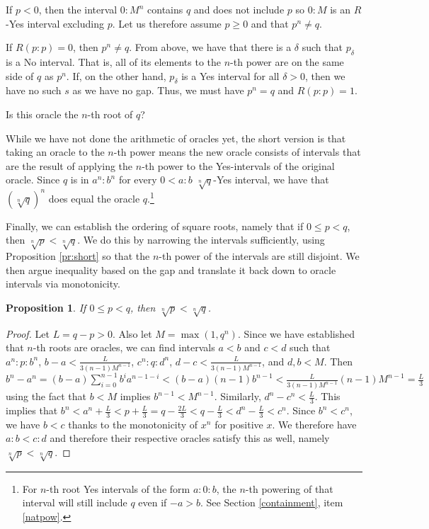 \documentclass[12pt]{article}
\newtheorem{proposition}{Proposition}[subsection]
\begin{document}
\begin{enumerate}
    If $p < 0$, then the interval $0:M^n$ contains $q$ and does not include $p$ so $0:M$ is an $R$-Yes interval excluding $p$. Let us therefore assume $p \geq 0$ and that $p^n \neq q$. 

    If $R(p:p) = 0$, then $p^n \neq q$. From above, we have that there is a $\delta$ such that $p_\delta$ is a No interval. That is, all of its elements to the $n$-th power are on the same side of $q$ as $p^n$. If, on the other hand, $p_\delta$ is a Yes interval for all $\delta > 0$, then we have no such $s$ as we have no gap. Thus, we must have $p^n = q$ and $R(p:p) = 1$.
    
\end{enumerate}

Is this oracle the $n$-th root of $q$?

While we have not done the arithmetic of oracles yet, the short version is that taking an oracle to the $n$-th power means the new oracle consists of intervals that are the result of applying the $n$-th power to the Yes-intervals of the original oracle. Since $q$ is in $a^n:b^n$ for every $0<a:b$ $\sqrt[n]{q}$-Yes interval, we have that $(\sqrt[n]{q})^n$ does equal the oracle $q$.\footnote{For $n$-th root Yes \-intervals of the form $a:0:b$, the $n$-th powering of that interval will still include $q$ even if $-a>b$. See Section \ref{containment}, item \ref{natpow}.} 

Finally, we can establish the ordering of square roots, namely that if $0 \leq p<q$, then $\sqrt[n]{p} < \sqrt[n]{q}$. We do this by narrowing the intervals sufficiently, using Proposition \ref{pr:short} so that the $n$-th power of the intervals are still disjoint. We then argue inequality based on the gap and translate it back down to oracle intervals via monotonicity. 

\begin{proposition}
    If $0 \leq p <q$, then $\sqrt[n]{p} < \sqrt[n]{q}$.
\end{proposition}

\begin{proof}
    Let $L = q-p > 0$. Also let $M = \max(1, q^n)$.  Since we have established that $n$-th roots are oracles, we can find intervals $a\lt b$ and $c \lt d$ such that $a^n:p:b^n$, $b-a < \frac{L}{3(n-1)M^{n-1}}$, $c^n:q:d^n$, $d-c < \frac{L}{3(n-1)M^{n-1}}$,  and $d, b < M$.  Then $b^n-a^n = (b-a) \sum_{i=0}^{n-1} b^i a^{n-1-i} < (b-a)(n-1) b^{n-1} < \frac{L}{3(n-1)M^{n-1}} (n-1) M^{n-1} = \frac{L}{3}$ using the fact that $b<M$ implies $b^{n-1} < M^{n-1}$. Similarly, $d^n-c^n < \frac{L}{3}$. This implies that $b^n < a^n + \frac{L}{3}  < p + \frac{L}{3}  = q - \frac{2 L }{3} < q -  \frac{L}{3} < d^n - \frac{L}{3} < c^n$. Since $b^n < c^n$, we have $b < c$ thanks to the monotonicity of $x^n$ for positive $x$. We therefore have $a:b < c:d$ and therefore their respective oracles satisfy this as well, namely $\sqrt[n]{p} < \sqrt[n]{q}$.
\end{proof}
\end{document}
